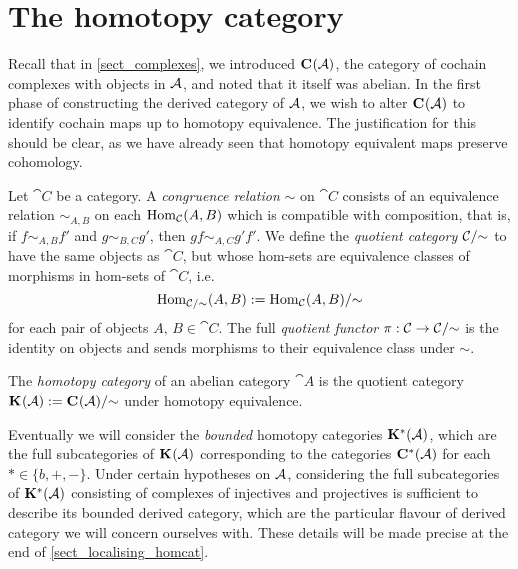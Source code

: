 \section{The homotopy category}

Recall that in \cref{sect_complexes}, we introduced $\Ch{\abcat{A}}$,
the category of cochain complexes with objects in $\abcat{A}$, and
noted that it itself was abelian.
In the first phase of constructing the derived category of
$\abcat{A}$, we wish to alter $\Ch{\abcat{A}}$ to identify cochain
maps up to homotopy equivalence.
The justification for this should be clear, as we have already seen
that homotopy equivalent maps preserve cohomology.

\begin{definition}
  Let $\cat{C}$ be a category.
  A \emph{congruence relation} $\sim$ on $\cat{C}$ consists of an
  equivalence relation $\sim_{A, B}$ on each $\Hom_{\cat{C}}(A, B)$
  which is compatible with composition, that is, if $f \sim_{A, B}
  f'$ and $g \sim_{B, C} g'$, then $gf \sim_{A, C} g'f'$.
  We define the \emph{quotient category} $\quot{\cat{C}}{\sim}$ to
  have the same objects as $\cat{C}$, but whose hom-sets are
  equivalence classes of morphisms in hom-sets of $\cat{C}$, i.e.
  \[
    \Hom_{\quot{\cat{C}}{\sim}}(A, B) := \quot{\Hom_{\cat{C}}(A, B)}{\sim}
  \]
  for each pair of objects $A,\, B \in \cat{C}$.
  The full \emph{quotient functor} $\pi: \cat{C} \to
  \quot{\cat{C}}{\sim}$ is the identity on objects and sends
  morphisms to their equivalence class under $\sim$.
\end{definition}

\begin{definition}
  The \emph{homotopy category} of an abelian category $\cat{A}$ is
  the quotient category $\homcat{\abcat{A}} :=
  \quot{\Ch{\abcat{A}}}{\sim}$ under homotopy equivalence.
\end{definition}

Eventually we will consider the \emph{bounded} homotopy categories
$\homcat[*]{\abcat{A}}$, which are the full subcategories of
$\homcat{\abcat{A}}$ corresponding to the categories
$\Ch[*]{\abcat{A}}$ for each $* \in \{b, +, -\}$.
Under certain hypotheses on $\abcat{A}$, considering the full
subcategories of $\homcat[*]{\abcat{A}}$ consisting of complexes of
injectives and projectives is sufficient to describe its bounded
derived category, which are the particular flavour of derived
category we will concern ourselves with.
These details will be made precise at the end of \cref{sect_localising_homcat}.

